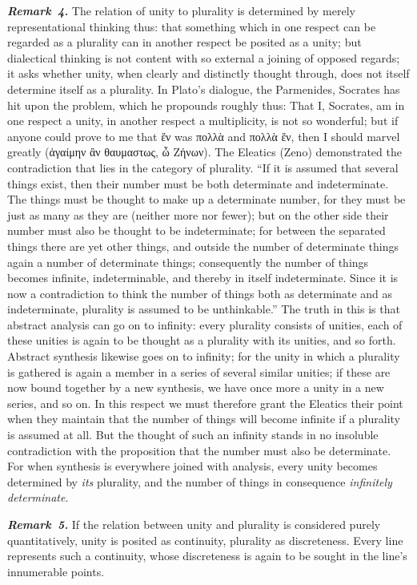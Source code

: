 \documentclass[12pt]{book}
\newcommand{\anm}[1]{\emph{\textbf{Remark~#1.}}}
\begin{document}
\anm{4} The relation of unity to plurality is determined by merely
representational thinking thus: that something which in one respect can be
regarded as a plurality can in another respect be posited as a unity; but
dialectical thinking is not content with so external a joining of opposed
regards; it asks whether unity, when clearly and distinctly thought through,
does not itself determine itself as a plurality. In Plato's dialogue, the
Parmenides, Socrates has hit upon the problem, which he propounds roughly
thus: That I, Socrates, am in one respect a unity, in another respect a
multiplicity, is not so wonderful; but if anyone could prove to me that ἕν
was πολλὰ and πολλὰ ἕν, then I should marvel greatly (ἀγαίμην ἂν θαυμαστως,
ὦ Ζήνων). The Eleatics (Zeno) demonstrated the contradiction that lies in
the category of plurality. ``If it is assumed that several things exist,
then their number must be both determinate and indeterminate. The things
must be thought to make up a determinate number, for they must be just as
many as they are (neither more nor fewer); but on the other side their
number must also be thought to be indeterminate; for between the separated
things there are yet other things, and outside the number of determinate
things again a number of determinate things; consequently the number of
things becomes infinite, indeterminable, and thereby in itself
indeterminate. Since it is now a contradiction to think the number of things
both as determinate and as indeterminate, plurality is assumed to be
unthinkable.'' The truth in this is that abstract analysis can go on to
infinity: every plurality consists of unities, each of these unities is
again to be thought as a plurality with its unities, and so forth. Abstract
synthesis likewise goes on to infinity; for the unity in which a plurality
is gathered is again a member in a series of several similar unities; if
these are now bound together by a new synthesis, we have once more a unity
in a new series, and so on. In this respect we must therefore grant the
Eleatics their point when they maintain that the number of things will
become infinite if a plurality is assumed at all. But the thought of such an
infinity stands in no insoluble contradiction with the proposition that the
number must also be determinate. For when synthesis is everywhere joined
with analysis, every unity becomes determined by \emph{its} plurality, and
the number of things in consequence \emph{infinitely determinate}.

\anm{5} If the relation between unity and plurality is considered purely
quantitatively, unity is posited as continuity, plurality as discreteness.
Every line represents such a continuity, whose discreteness is again to be
sought in the line's innumerable points.
\end{document}
